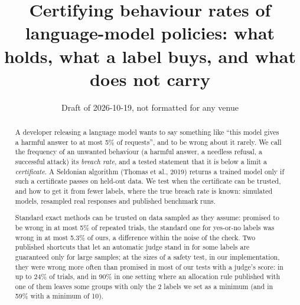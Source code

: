 \documentclass[11pt]{article}
\title{Certifying behaviour rates of language-model policies: what holds, what a label buys, and what does not carry}
\author{}
\date{Draft of 2026-10-19, not formatted for any venue}
\begin{document}
\maketitle
\begin{abstract}

A developer releasing a language model wants to say something like ``this model gives a harmful answer to at most 5\% of requests'', and to be wrong about it rarely. We call the frequency of an unwanted behaviour (a harmful answer, a needless refusal, a successful attack) its \emph{breach rate}, and a tested statement that it is below a limit a \emph{certificate}. A Seldonian algorithm (Thomas et al., 2019) returns a trained model only if such a certificate passes on held-out data. We test when the certificate can be trusted, and how to get it from fewer labels, where the true breach rate is known: simulated models, resampled real responses and published benchmark runs.


Standard exact methods can be trusted on data sampled as they assume: promised to be wrong in at most 5\% of repeated trials, the standard one for yes-or-no labels was wrong in at most 5.3\% of ours, a difference within the noise of the check. Two published shortcuts that let an automatic judge stand in for some labels are guaranteed only for large samples; at the sizes of a safety test, in our implementation, they were wrong more often than promised in most of our tests with a judge's score: in up to 24\% of trials, and in 90\% in one setting where an allocation rule published with one of them leaves some groups with only the 2 labels we set as a minimum (and in 59\% with a minimum of 10).



\end{abstract}
\end{document}
